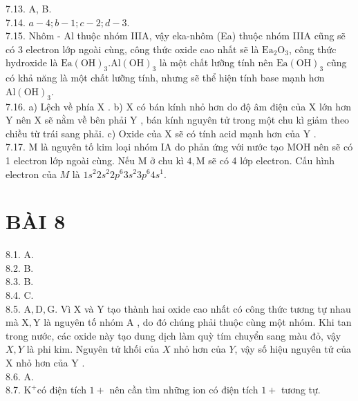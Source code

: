 \documentclass[10pt]{article}
\begin{document}
7.13. A, B.\\
7.14. $a-4 ; b-1 ; c-2 ; d-3$.\\
7.15. Nhôm - Al thuộc nhóm IIIA, vậy eka-nhôm (Ea) thuộc nhóm IIIA cũng sẽ có 3 electron lớp ngoài cùng, công thức oxide cao nhất sẽ là $\mathrm{Ea}_{2} \mathrm{O}_{3}$, công thức hydroxide là $\mathrm{Ea}(\mathrm{OH})_{3} . \mathrm{Al}(\mathrm{OH})_{3}$ là một chất lưỡng tính nên $\mathrm{Ea}(\mathrm{OH})_{3}$ cũng có khả năng là một chất lưỡng tính, nhưng sẽ thể hiện tính base mạnh hơn $\mathrm{Al}(\mathrm{OH})_{3}$.\\
7.16. a) Lệch về phía X . b) X có bán kính nhỏ hơn do độ âm điện của X lớn hơn Y nên X sẽ nằm về bên phải Y , bán kính nguyên tử trong một chu kì giảm theo chiều từ trái sang phải. c) Oxide của X sẽ có tính acid mạnh hơn của Y .\\
7.17. M là nguyên tố kim loại nhóm IA do phản ứng với nước tạo MOH nên sẽ có 1 electron lớp ngoài cùng. Nếu M ở chu kì $4, \mathrm{M}$ sẽ có 4 lớp electron. Cấu hình electron của $M$ là $1 s^{2} 2 s^{2} 2 p^{6} 3 s^{2} 3 p^{6} 4 s^{1}$.

\section*{BÀI 8}
8.1. A.\\
8.2. B.\\
8.3. B.\\
8.4. C.\\
8.5. $\mathrm{A}, \mathrm{D}, \mathrm{G}$. Vì X và Y tạo thành hai oxide cao nhất có công thức tương tự nhau mà $\mathrm{X}, \mathrm{Y}$ là nguyên tố nhóm A , do đó chúng phải thuộc cùng một nhóm. Khi tan trong nước, các oxide này tạo dung dịch làm quỳ tím chuyển sang màu đỏ, vậy $X, Y$ là phi kim. Nguyên tử khối của $X$ nhỏ hơn của $Y$, vậy số hiệu nguyên tử của X nhỏ hơn của Y .\\
8.6. A.\\
8.7. $\mathrm{K}^{+}$có điện tích $1+$ nên cần tìm những ion có điện tích $1+$ tương tự.
\end{document}
